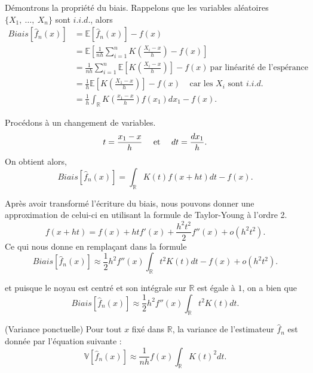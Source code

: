 \documentclass[
]{book}
\begin{document}
\begin{demo}
Démontrons la propriété du biais.
Rappelons que les variables aléatoires $\{ X_1,~\dots, ~X_n\}$ sont $i.i.d.$, alors
$$
\begin{aligned}
Biais  \left[ \hat f_n(x) \right] &= \mathbb E \left[ \hat f_n(x) \right] - f(x) \\
&= \mathbb E \left[ \frac1{nh} \sum\limits_{i=1}^n K\left(\frac{X_i-x}h\right) - f(x) \right] \\
&= \frac1{nh} \sum\limits_{i=1}^n \mathbb E \left[  K\left(\frac{X_i-x}h\right) \right] - f(x) ~\text{par linéarité de l'espérance} \\
&= \frac1{h} \mathbb E \left[  K\left(\frac{X_1-x}h\right) \right] - f(x) ~~~~~\text{car les } X_i \text{ sont }i.i.d.\\
&= \frac1{h} \int_{\mathbb R}  K\left(\frac{x_1-x}h\right) f(x_1)dx_1 - f(x).
\end{aligned}
$$

Procédons à un changement de variables.
$$t=\frac{x_1-x}h ~~~~\hbox{et}~~~~dt =\frac{dx_1}h.$$
On obtient alors, 
$$
Biais  \left[ \hat f_n(x) \right]
= \int_{\mathbb R}  K(t)  f(x+ht)dt - f(x).
$$

Après avoir transformé l'écriture du biais, nous pouvons donner une approximation de celui-ci en utilisant la formule de Taylor-Young à l'ordre 2.
$$f(x+ht)=f(x)+htf'(x)+\frac{h^2t^2}2 f''(x)+o(h^2t^2).$$
Ce qui nous donne en remplaçant dans la formule
$$
Biais \left[ \hat f_n(x) \right] \approx \frac12h^2f''(x)\int_{\mathbb R} t^2K(t) dt - f(x) + o(h^2t^2).
$$

et puisque le noyau est centré et son intégrale sur $\mathbb R$ est égale à $1$, on a bien que 
$$Biais \left[ \hat f_n(x) \right] \approx \frac12h^2f''(x)\int_{\mathbb R} t^2K(t) dt.$$

\end{demo}

\begin{propri} (Variance ponctuelle)
Pour tout $x$ fixé dans $\mathbb R$, la variance de l'estimateur $\hat f_n$ est donnée par l'équation suivante : 
$$\mathbb V \left[ \hat f_n(x) \right] \approx \frac1{nh} f(x) \int_{\mathbb R}K(t)^2 dt.$$
\end{propri}
\end{document}
